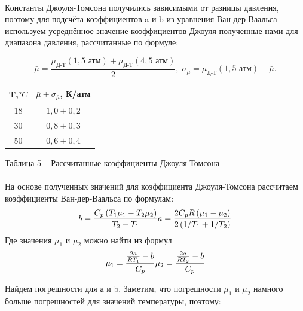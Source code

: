 \documentclass[a4paper,12pt]{article} %
\begin{document}
\paragraph{}
Константы Джоуля-Томсона получились зависимыми от разницы давления, поэтому для подсчёта коэффициентов a и b из уравнения Ван-дер-Ваальса используем усреднённое значение коэффициентов Джоуля полученные нами для диапазона давления, рассчитанные по формуле:

\[
\bar{\mu} = \frac{
	\mu_\text{Д-Т}\left( 1,5 \text{ атм} \right) + \mu_\text{Д-Т}\left( 4,5 \text{ атм} \right)}{2}, \;  \sigma_{\bar{\mu}} = \mu_\text{Д-Т}\left( 1,5 \text{ атм} \right) - \bar{\mu}.
\]

\begin{table}[h]	
\begin{center}
\begin{tabular}{|c|c|}
\hline 
T,$^oC$ & $\bar{\mu} \pm \sigma_{\bar{\mu}}$, К/атм \\ 
\hline 
18 & $1,0 \pm 0,2$  \\ 
\hline 
30 & $0,8 \pm 0,3$ \\ 
\hline 
50 & $0,6 \pm  0,4$\\ 
\hline 
\end{tabular} 
\end{center}
\begin{center}

Таблица 5 -- Рассчитанные коэффициенты Джоуля-Томсона

\end{center}
\end{table}

\paragraph{}
На основе полученных значений для коэффициента Джоуля-Томсона рассчитаем коэффициенты Ван-дер-Ваальса по формулам:
\begin{equation*}
b = \frac{C_p \left(T_1 \mu_1 - T_2 \mu_2 \right)}{T_2 - T_1} \\
a = \frac{2 C_p R \left( \mu_1 - \mu_2 \right) }{2 \left( 1/T_1 + 1/T_2 \right)}
\end{equation*}
 Где значения $\mu_1$ и $\mu_2$ можно найти из формул
\begin{equation*} 
\mu_1 = \frac{\frac{2a}{R T_1} - b}{C_p} \\
\mu_2 = \frac{\frac{2a}{R T_2} - b}{C_p}
\end{equation*}

Найдем погрешности для а и b. Заметим, что погрешности $\mu_1$ и $\mu_2$ намного больше погрешностей для значений температуры, поэтому:
\end{document}

